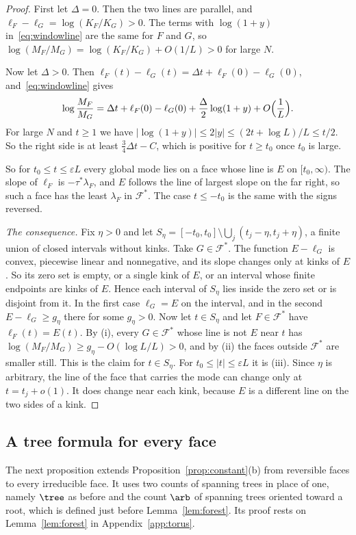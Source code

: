 \begin{proof}
First let $\Delta=0$. Then the two lines are parallel, and $\ell_F-\ell_G=\log(K_F/K_G)>0$. The
terms with $\log(1+y)$ in~\eqref{eq:windowline} are the same for $F$ and $G$, so
$\log(M_F/M_G)=\log(K_F/K_G)+O(1/L)>0$ for large $N$.

Now let $\Delta>0$. Then $\ell_F(t)-\ell_G(t)=\Delta t+\ell_F(0)-\ell_G(0)$,
and~\eqref{eq:windowline} gives
\[
\log\frac{M_F}{M_G}=\Delta t+\ell_F(0)-\ell_G(0)+\frac\Delta2\log(1+y)+O\Bigl(\frac1L\Bigr).
\]
For large $N$ and $t\ge1$ we have $|\log(1+y)|\le2|y|\le(2t+\log L)/L\le t/2$. So the right
side is at least $\frac34\Delta t-C$, which is positive for $t\ge t_0$ once $t_0$ is large.

So for $t_0\le t\le\varepsilon L$ every global mode lies on a face whose line is $E$ on
$[t_0,\infty)$. The slope of $\ell_F$ is $-\tau^*\lambda_F$, and $E$ follows the line of largest
slope on the far right, so such a face has the least $\lambda_F$ in $\mathcal F^*$. The case
$t\le-t_0$ is the same with the signs reversed.

\emph{The consequence.} Fix $\eta>0$ and let
$S_\eta=[-t_0,t_0]\setminus\bigcup_j(t_j-\eta,t_j+\eta)$, a finite union of closed intervals
without kinks. Take $G\in\mathcal F^*$. The function $E-\ell_G$ is convex, piecewise linear and
nonnegative, and its slope changes only at kinks of $E$. So its zero set is empty, or a single
kink of $E$, or an interval whose finite endpoints are kinks of $E$. Hence each interval of
$S_\eta$ lies inside the zero set or is disjoint from it. In the first case $\ell_G=E$ on the
interval, and in the second $E-\ell_G\ge g_\eta$ there for some $g_\eta>0$. Now let $t\in S_\eta$
and let $F\in\mathcal F^*$ have $\ell_F(t)=E(t)$. By (i), every $G\in\mathcal F^*$ whose line is
not $E$ near $t$ has $\log(M_F/M_G)\ge g_\eta-O(\log L/L)>0$, and by (ii) the faces outside
$\mathcal F^*$ are smaller still. This is the claim for $t\in S_\eta$. For
$t_0\le|t|\le\varepsilon L$ it is (iii). Since $\eta$ is arbitrary, the line of the face that
carries the mode can change only at $t=t_j+o(1)$. It does change near each kink, because $E$ is
a different line on the two sides of a kink.
\end{proof}


\subsection{A tree formula for every face}\label{sec:forest}

The next proposition extends Proposition~\ref{prop:constant}(b) from reversible faces to every
irreducible face. It uses two counts of spanning trees in place of one, namely
$\tree$ as before and the count $\arb$ of spanning trees oriented toward a root, which is
defined just before Lemma~\ref{lem:forest}. Its proof rests on
Lemma~\ref{lem:forest} in Appendix~\ref{app:torus}.

